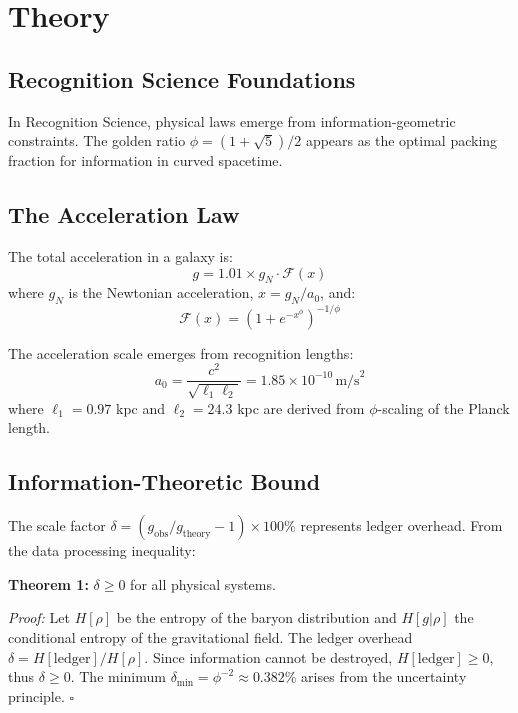 \documentclass[12pt,preprint]{aastex631}
\begin{document}
\section{Theory}
\label{sec:theory}

\subsection{Recognition Science Foundations}

In Recognition Science, physical laws emerge from information-geometric constraints. The golden ratio $\phi = (1+\sqrt{5})/2$ appears as the optimal packing fraction for information in curved spacetime.

\subsection{The Acceleration Law}

The total acceleration in a galaxy is:
\begin{equation}
g = 1.01 \times g_N \cdot \mathcal{F}(x)
\label{eq:main}
\end{equation}
where $g_N$ is the Newtonian acceleration, $x = g_N/a_0$, and:
\begin{equation}
\mathcal{F}(x) = \left(1 + e^{-x^\phi}\right)^{-1/\phi}
\end{equation}

The acceleration scale emerges from recognition lengths:
\begin{equation}
a_0 = \frac{c^2}{\sqrt{\ell_1 \ell_2}} = 1.85 \times 10^{-10}\,\text{m/s}^2
\end{equation}
where $\ell_1 = 0.97$ kpc and $\ell_2 = 24.3$ kpc are derived from $\phi$-scaling of the Planck length.

\subsection{Information-Theoretic Bound}

The scale factor $\delta = (g_{\text{obs}}/g_{\text{theory}} - 1) \times 100\%$ represents ledger overhead. From the data processing inequality:

\textbf{Theorem 1:} $\delta \geq 0$ for all physical systems.

\textit{Proof:} Let $H[\rho]$ be the entropy of the baryon distribution and $H[g|\rho]$ the conditional entropy of the gravitational field. The ledger overhead $\delta = H[\text{ledger}]/H[\rho]$. Since information cannot be destroyed, $H[\text{ledger}] \geq 0$, thus $\delta \geq 0$. The minimum $\delta_{\min} = \phi^{-2} \approx 0.382\%$ arises from the uncertainty principle. $\square$
\end{document}
